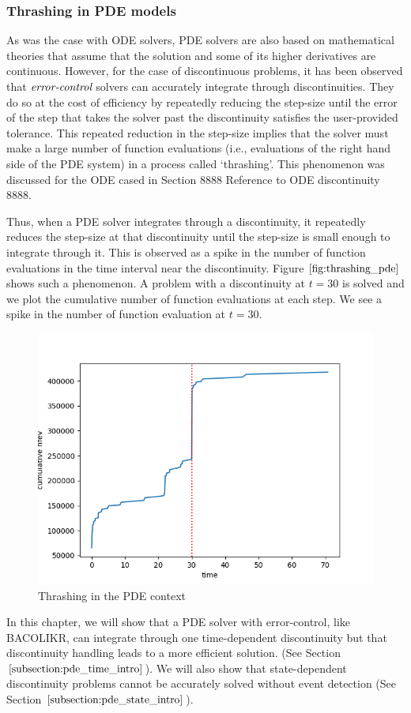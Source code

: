 \documentclass{article}
\begin{document}
\subsubsection{Thrashing in PDE models}
\label{subsection:pde_thrashing}
As was the case with ODE solvers, PDE solvers are also based on mathematical theories that assume that the solution and some of its higher derivatives are continuous. However, for the case of discontinuous problems, it has been observed that $\emph{error-control}$ solvers can accurately integrate through discontinuities. They do so at the cost of efficiency by repeatedly reducing the step-size until the error of the step that takes the solver past the discontinuity satisfies the user-provided tolerance. This repeated reduction in the step-size implies that the solver must make a large number of function evaluations (i.e., evaluations of the right hand side of the PDE system) in a process called `thrashing'. This phenomenon was discussed for the ODE cased in Section 8888 Reference to ODE discontinuity 8888.

Thus, when a PDE solver integrates through a discontinuity, it repeatedly reduces the step-size at that discontinuity until the step-size is small enough to integrate through it. This is observed as a spike in the number of function evaluations in the time interval near the discontinuity. Figure $\ref{fig:thrashing_pde}$ shows such a phenomenon. A problem with a discontinuity at $t=30$ is solved and we plot the cumulative number of function evaluations at each step. We see a spike in the number of function evaluation at $t=30$.
\begin{figure}[H]
\centering
\includegraphics[width=0.7\linewidth]{./figures/pde_thrashing}
\caption{Thrashing in the PDE context}
\label{fig:thrashing_pde}
\end{figure}

In this chapter, we will show that a PDE solver with error-control, like BACOLIKR, can integrate through one time-dependent discontinuity but that discontinuity handling leads to a more efficient solution.
(See Section $\ref{subsection:pde_time_intro}$). We will also show that state-dependent discontinuity problems cannot be accurately solved without event detection (See Section $\ref{subsection:pde_state_intro}$).
\end{document}
